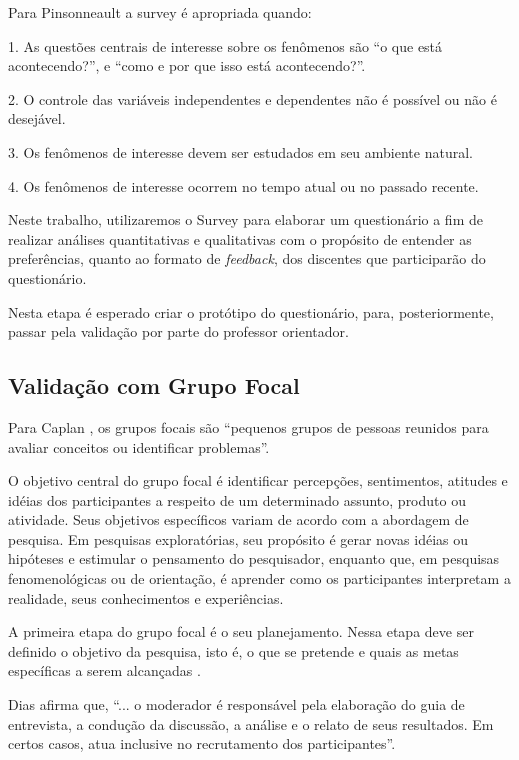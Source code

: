 Para Pinsonneault \cite{pinsonneault1993survey} a survey é apropriada quando:

1. As questões centrais de interesse sobre os fenômenos são ``o que está acontecendo?'', e ``como e por que isso está acontecendo?''.

2. O controle das variáveis independentes e dependentes não é possível ou não é desejável.

3. Os fenômenos de interesse devem ser estudados em seu ambiente natural.

4. Os fenômenos de interesse ocorrem no tempo atual ou no passado recente.

Neste trabalho, utilizaremos o Survey para elaborar um questionário a fim de realizar análises quantitativas e qualitativas com o propósito de entender as preferências, quanto ao formato de \textit{feedback}, dos discentes que participarão do questionário.

Nesta etapa é esperado criar o protótipo do questionário, para, posteriormente, passar pela validação por parte do professor orientador.

\subsection{Validação com Grupo Focal}

Para Caplan \cite{caplan1990using}, os grupos focais são “pequenos grupos de pessoas reunidos para avaliar conceitos ou identificar problemas”.

O objetivo central do grupo focal é identificar percepções, sentimentos, atitudes e
idéias dos participantes a respeito de um determinado assunto, produto ou atividade. Seus
objetivos específicos variam de acordo com a abordagem de pesquisa. Em pesquisas
exploratórias, seu propósito é gerar novas idéias ou hipóteses e estimular o pensamento do
pesquisador, enquanto que, em pesquisas fenomenológicas ou de orientação, é aprender
como os participantes interpretam a realidade, seus conhecimentos e experiências.\cite{dias2000grupo}

A primeira etapa do grupo focal é o seu planejamento. Nessa etapa deve ser
definido o objetivo da pesquisa, isto é, o que se pretende e quais as metas específicas a
serem alcançadas \cite{dias2000grupo}.

Dias \cite{dias2000grupo} afirma que, ``... o moderador é responsável pela elaboração do guia de entrevista, a condução da discussão, a análise e o relato de seus resultados. Em certos casos, atua inclusive no recrutamento dos participantes''.

